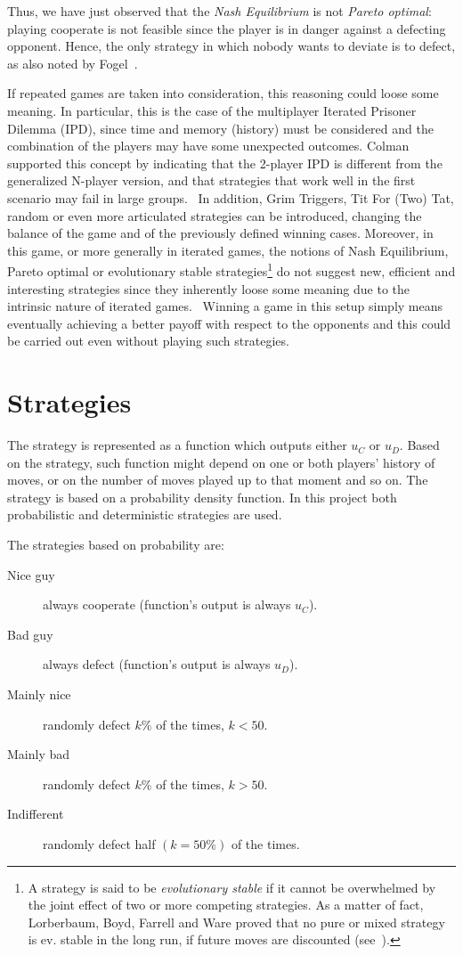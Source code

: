\documentclass[journal,10pt,twoside]{IEEEtran}
\begin{document}
Thus, we have just observed that the \textit{Nash Equilibrium} is not \textit{Pareto optimal}: playing cooperate is not feasible since the player is in danger against a defecting opponent. Hence, the only strategy in which nobody wants to deviate is to defect, as also noted by Fogel~\cite{fogelEvolvingBehaviors}.

If repeated games are taken into consideration, this reasoning could loose some meaning. In particular, this is the case of the multiplayer Iterated Prisoner Dilemma (IPD), since time and memory (history) must be considered and the combination of the players may have some unexpected outcomes.
Colman supported this concept by indicating that the 2-player IPD is different from the generalized N-player version, and that strategies that work well in the first scenario may fail in large groups.~\cite{yao1994experimental}
In addition, Grim Triggers, Tit For (Two) Tat, random or even more articulated strategies can be introduced, changing the balance of the game and of the previously defined winning cases.
Moreover, in this game, or more generally in iterated games, the notions of Nash Equilibrium, Pareto optimal or evolutionary stable strategies\footnote{A strategy is said to be \textit{evolutionary stable} if it cannot be overwhelmed by the joint effect of two or more competing strategies. As a matter of fact, Lorberbaum, Boyd, Farrell and Ware proved that no pure or mixed strategy is ev. stable in the long run, if future moves are discounted (see~\cite{lorb94}).} do not suggest new, efficient and interesting strategies since they inherently loose some meaning due to the intrinsic nature of iterated games.~\cite{mathieu2017}
Winning a game in this setup simply means eventually achieving a better payoff with respect to the opponents and this could be carried out even without playing such strategies.

\section{Strategies} \label{s:str}
The strategy is represented as a function which outputs either $u_C$ or $u_D$. Based on the strategy, such function might depend on one or both players' history of moves, or on the number of moves played up to that moment and so on.
The strategy is based on a probability density function. In this project both probabilistic and deterministic strategies are used.

The strategies based on probability are:
\begin{description}
    \item[Nice guy] always cooperate (function's output is always $u_C$).
    \item[Bad guy] always defect (function's output is always $u_D$).
    \item[Mainly nice] randomly defect $k\%$ of the times, $k<50$.
    \item[Mainly bad] randomly defect $k\%$ of the times, $k>50$.
    \item[Indifferent] randomly defect half $(k=50\%)$ of the times.
\end{description}
\end{document}

